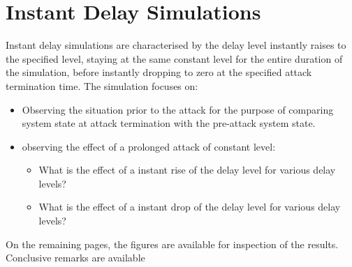 \section{Instant Delay Simulations}
Instant delay simulations are characterised by the delay level instantly raises to the specified level, staying at the same constant level for the entire duration of the simulation, before instantly dropping to zero at the specified attack termination time.
The simulation focuses on:
\begin{itemize}
    \item Observing the situation prior to the attack for the purpose of comparing system state at attack termination with the pre-attack system state.
    \item observing the effect of a prolonged attack of constant level:
    \begin{itemize}
        \item What is the effect of a instant rise of the delay level for various delay levels?
        \item What is the effect of a instant drop of the delay level for various delay levels?
    \end{itemize}
\end{itemize}

On the remaining pages, the figures are available for inspection of the results. Conclusive remarks are available 









